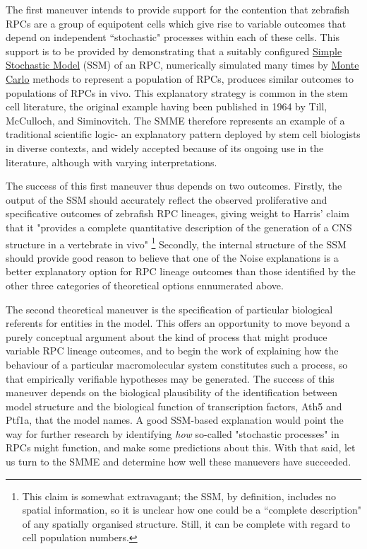 The first maneuver intends to provide support for the contention that zebrafish RPCs are a group of equipotent cells which give rise to variable outcomes that depend on independent ``stochastic" processes within each of these cells. This support is to be provided by demonstrating that a suitably configured \hyperref[SSM]{Simple Stochastic Model} (SSM) of an RPC, numerically simulated many times by \hyperref[MonteCarlo]{Monte Carlo} methods to represent a population of RPCs, produces similar outcomes to populations of RPCs in vivo. This explanatory strategy is common in the stem cell literature, the original example having been published in 1964 by Till, McCulloch, and Siminovitch\cite{Till1964}. The SMME therefore represents an example of a traditional scientific logic- an explanatory pattern deployed by stem cell biologists in diverse contexts, and widely accepted because of its ongoing use in the literature, although with varying interpretations.

The success of this first maneuver thus depends on two outcomes. Firstly, the output of the SSM should accurately reflect the observed proliferative and specificative outcomes of zebrafish RPC lineages, giving weight to Harris' claim that it "provides a complete quantitative description of the generation of a CNS structure in a vertebrate in vivo" \cite{He2012}\footnote{This claim is somewhat extravagant; the SSM, by definition, includes no spatial information, so it is unclear how one could be a ``complete description" of any spatially organised structure. Still, it can be complete with regard to cell population numbers.} Secondly, the internal structure of the SSM should provide good reason to believe that one of the Noise explanations is a better explanatory option for RPC lineage outcomes than those identified by the other three categories of theoretical options ennumerated above.

The second theoretical maneuver is the specification of particular biological referents for entities in the model. This offers an opportunity to move beyond a purely conceptual argument about the kind of process that might produce variable RPC lineage outcomes, and to begin the work of explaining how the behaviour of a particular macromolecular system constitutes such a process, so that empirically verifiable hypotheses may be generated. The success of this maneuver depends on the biological plausibility of the identification between model structure and the biological function of transcription factors, Ath5 and Ptf1a, that the model names. A good SSM-based explanation would point the way for further research by identifying \textit{how} so-called "stochastic processes" in RPCs might function, and make some predictions about this. With that said, let us turn to the SMME and determine how well these manuevers have succeeded.